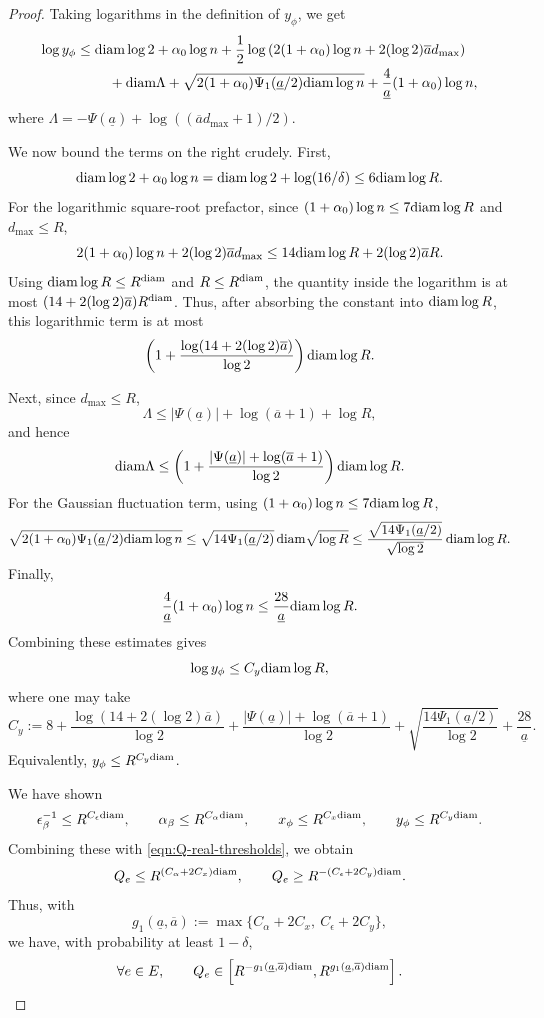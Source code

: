 \documentclass[a4paper, 11pt]{article}
\newcommand{\diam}{\textnormal{diam}}
\begin{document}
\begin{proof}
Taking logarithms in the definition of \(y_\phi\), we get
\[
\begin{aligned}
\log y_\phi
\le{}&
\diam\log2+\alpha_0\log n
+\frac12\log\left(2(1+\alpha_0)\log n+2(\log2)\overline a d_{\max}\right) \\
&\quad
+\diam\Lambda
+\sqrt{2(1+\alpha_0)\Psi_1(\underline a/2)\diam\log n}
+\frac{4}{\underline a}(1+\alpha_0)\log n ,
\end{aligned}
\]
where \(\Lambda=-\Psi(\underline a)+\log((\overline a d_{\max}+1)/2)\).

We now bound the terms on the right crudely. First,
\[
\diam\log2+\alpha_0\log n
=
\diam\log2+\log(16/\delta)
\le6\diam\log R.
\]
For the logarithmic square-root prefactor, since \((1+\alpha_0)\log n\le7\diam\log R\) and \(d_{\max}\le R\),
\[
2(1+\alpha_0)\log n+2(\log2)\overline a d_{\max}
\le
14\diam\log R+2(\log2)\overline a R.
\]
Using \(\diam\log R\le R^\diam\) and \(R\le R^\diam\), the quantity inside the logarithm is at most
\((14+2(\log2)\overline a)R^\diam\). Thus, after absorbing the constant into
\(\diam\log R\), this logarithmic term is at most
\[
\left(1+\frac{\log(14+2(\log2)\overline a)}{\log2}\right)\diam\log R.
\]

Next, since \(d_{\max}\le R\),
\[
\Lambda\le |\Psi(\underline a)|+\log(\overline a+1)+\log R,
\]
and hence
\[
\diam\Lambda
\le
\left(
1+\frac{|\Psi(\underline a)|+\log(\overline a+1)}{\log2}
\right)\diam\log R.
\]
For the Gaussian fluctuation term, using \((1+\alpha_0)\log n\le7\diam\log R\),
\[
\sqrt{2(1+\alpha_0)\Psi_1(\underline a/2)\diam\log n}
\le
\sqrt{14\Psi_1(\underline a/2)}\,\diam\sqrt{\log R}
\le
\frac{\sqrt{14\Psi_1(\underline a/2)}}{\sqrt{\log2}}\,\diam\log R.
\]
Finally,
\[
\frac{4}{\underline a}(1+\alpha_0)\log n
\le
\frac{28}{\underline a}\diam\log R.
\]
Combining these estimates gives
\[
\log y_\phi\le C_y\diam\log R,
\]
where one may take
\[
C_y
:=
8
+
\frac{\log(14+2(\log2)\overline a)}{\log2}
+
\frac{|\Psi(\underline a)|+\log(\overline a+1)}{\log2}
+
\sqrt{\frac{14\Psi_1(\underline a/2)}{\log2}}
+
\frac{28}{\underline a}.
\]
Equivalently, \(y_\phi\le R^{C_y\diam}\).

We have shown
\[
\epsilon_\beta^{-1}\le R^{C_\epsilon\diam},
\qquad
\alpha_\beta\le R^{C_\alpha\diam},
\qquad
x_\phi\le R^{C_x\diam},
\qquad
y_\phi\le R^{C_y\diam}.
\]
Combining these with \eqref{eqn:Q-real-thresholds}, we obtain
\[
Q_e\le R^{(C_\alpha+2C_x)\diam},
\qquad
Q_e\ge R^{-(C_\epsilon+2C_y)\diam}.
\]
Thus, with
\[
g_1(\underline a,\overline a)
:=
\max\{C_\alpha+2C_x,\ C_\epsilon+2C_y\},
\]
we have, with probability at least \(1-\delta\),
\[
\forall e\in E,\qquad
Q_e\in
\left[
R^{-g_1(\underline a,\overline a)\diam},
R^{g_1(\underline a,\overline a)\diam}
\right].
\]


\end{proof}
\end{document}
